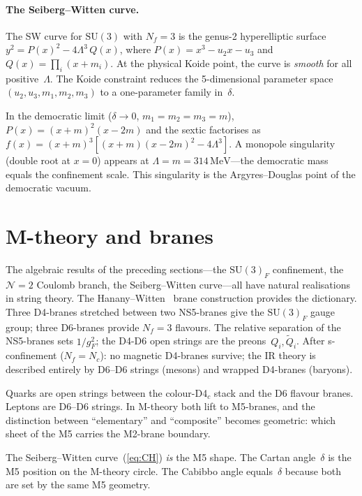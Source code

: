 \documentclass[aps,prd,twocolumn,showpacs,preprintnumbers,superscriptaddress]{revtex4-2}
\newcommand{\SU}{\mathrm{SU}}
\newcommand{\Nc}{N_c}
\newcommand{\Nf}{N_f}
\newcommand{\MeV}{\,\mathrm{MeV}}
\begin{document}
\paragraph{The Seiberg--Witten curve.}

The SW curve for $\SU(3)$ with $\Nf = 3$ is the genus-2
hyperelliptic surface
$y^2 = P(x)^2 - 4\Lambda^3\,Q(x)$,
where $P(x) = x^3 - u_2 x - u_3$ and
$Q(x) = \prod_i(x+m_i)$.
At the physical Koide point, the curve is \emph{smooth} for
all positive~$\Lambda$.
The Koide constraint reduces the 5-dimensional parameter space
$(u_2, u_3, m_1, m_2, m_3)$ to a one-parameter family
in~$\delta$.

In the democratic limit ($\delta \to 0$, $m_1 = m_2 = m_3 = m$),
$P(x) = (x+m)^2(x-2m)$ and the sextic factorises as
$f(x) = (x+m)^3[(x+m)(x-2m)^2 - 4\Lambda^3]$.
A monopole singularity (double root at $x = 0$) appears at
$\Lambda = m = 314\MeV$---the democratic mass equals the
confinement scale.
This singularity is the Argyres--Douglas point of the
democratic vacuum.

\section{M-theory and branes}
\label{sec:Mtheory}

The algebraic results of the preceding sections---the
$\SU(3)_F$ confinement, the $\mathcal{N}{=}2$ Coulomb
branch, the Seiberg--Witten curve---all have natural
realisations in string theory.
The Hanany--Witten~\cite{HananyWitten:1997} brane
construction provides the dictionary.
Three D4-branes stretched between two NS5-branes give the
$\SU(3)_F$ gauge group; three D6-branes provide
$\Nf = 3$ flavours.
The relative separation of the NS5-branes sets
$1/g_F^2$; the D4-D6 open strings are the
preons~$Q_i, \tilde Q_i$.
After s-confinement ($\Nf = \Nc$): no magnetic D4-branes
survive; the IR theory is described entirely by D6--D6
strings (mesons) and wrapped D4-branes (baryons).

Quarks are open strings between the colour-D4$_c$ stack and
the D6 flavour branes.  Leptons are D6--D6 strings.  In
M-theory both lift to M5-branes, and the distinction between
``elementary'' and ``composite'' becomes geometric: which
sheet of the M5 carries the M2-brane boundary.

The Seiberg--Witten curve~(\ref{eq:CH}) \emph{is} the M5
shape.  The Cartan angle~$\delta$ is the M5 position on the
M-theory circle.  The Cabibbo angle equals~$\delta$ because
both are set by the same M5 geometry.
\end{document}
